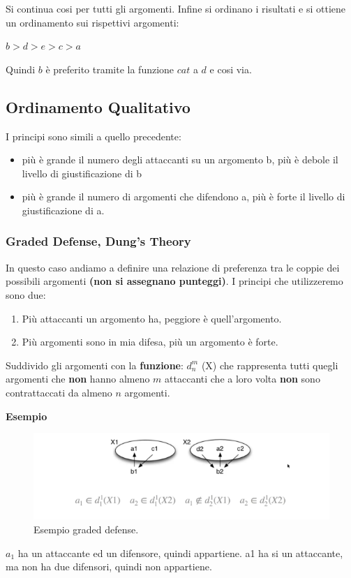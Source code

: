 \vspace{0.3cm}

Si continua cosi per tutti gli argomenti. Infine si ordinano i risultati e
si ottiene un ordinamento sui rispettivi argomenti:
\begin{center}
    $b>d>e>c>a$
\end{center}
Quindi $b$ è preferito tramite la funzione $cat$ a $d$ e cosi via.
\subsection{Ordinamento Qualitativo}
I principi sono simili a quello precedente:
\begin{itemize}
    \item più è grande il numero degli attaccanti su un argomento b, più è
          debole il livello di giustificazione di b
    \item più è grande il numero di argomenti che difendono a, più è forte
          il livello di giustificazione di a.
\end{itemize}
\subsubsection{Graded Defense, Dung's Theory}
In questo caso andiamo a definire una relazione di preferenza tra le coppie
dei possibili argomenti \textbf{(non si assegnano punteggi)}. I principi che
utilizzeremo sono due:
\begin{enumerate}
    \item Più attaccanti un argomento ha, peggiore è quell'argomento.
    \item Più argomenti sono in mia difesa, più un argomento è forte.

\end{enumerate}
Suddivido gli argomenti con la \textbf{funzione}: $d^m_n$ (X) che
rappresenta tutti quegli argomenti che \textbf{non} hanno almeno $m$
attaccanti che a loro volta \textbf{non} sono contrattaccati da almeno $n$
argomenti.

\vspace{0.3cm}

\textbf{Esempio}

\begin{figure}[htp]
    \centering
    \includegraphics[width=13cm, keepaspectratio]{capitoli/img/Cap8/defense.png}
    \caption{Esempio graded defense.}
\end{figure}
$a_1$ ha un attaccante ed un difensore, quindi appartiene. a1 ha si un
attaccante, ma non ha due difensori, quindi non appartiene.

